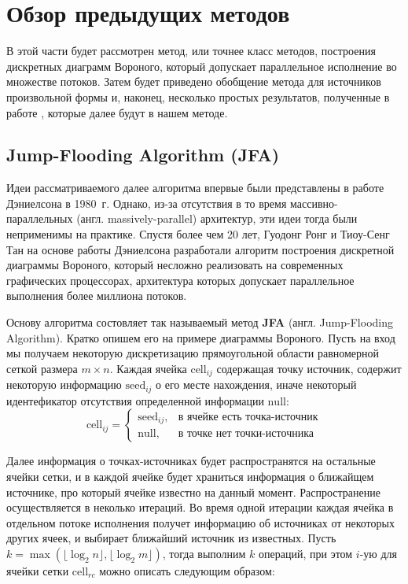 \documentclass[12pt]{article}
\begin{document}
\section{Обзор предыдущих методов}
В этой части будет рассмотрен метод, или точнее класс методов, построения
дискретных диаграмм Вороного, который допускает
параллельное исполнение во множестве потоков. Затем будет приведено обобщение
метода для источников произвольной формы и, наконец, несколько простых
результатов, полученные в работе \cite{timeb}, которые далее будут в нашем методе.

\subsection{Jump-Flooding Algorithm (JFA)}
\label{jfa_desc}
Идеи рассматриваемого далее алгоритма впервые были представлены в работе
Дэниелсона \cite{distmap} в 1980~г. Однако, из-за отсутствия в то время
массивно-параллельных (англ. massively-parallel) архитектур, эти идеи тогда
были неприменимы на практике. Спустя более чем 20 лет, Гуодонг Ронг и
Тиоу-Сенг Тан \cite{jfa} на основе работы Дэниелсона разработали алгоритм
построения дискретной диаграммы Вороного, который несложно реализовать на
современных графических процессорах, архитектура которых допускает параллельное
выполнения более миллиона потоков.

Основу алгоритма состовляет так называемый метод \textbf{JFA} (англ.
Jump-Flooding Algorithm). Кратко опишем его на примере диаграммы Вороного.
Пусть на вход мы получаем 
некоторую дискретизацию прямоугольной области равномерной сеткой размера
$m \times n$. Каждая ячейка $\mathrm{cell}_{ij}$ содержащая точку источник,
содержит некоторую информацию $\mathrm{seed}_{ij}$ о его месте нахождения,
иначе некоторый идентефикатор отсутствия определенной информации ${\mathrm{null}}$:
$$
	\mathrm{cell}_{ij} = \left\lbrace
	\begin{array}{ll}
	\mathrm{seed}_{ij}, & \mbox{в ячейке есть точка-источник} \\
	\mathrm{null}, & \mbox{в точке нет точки-источника}
	\end{array}
	\right.
$$

Далее информация о точках-источниках будет распространятся на остальные ячейки
сетки, и в каждой ячейке будет храниться информация о ближайщем источнике, про
который ячейке известно на данный момент. Распространение осуществляется в
неколько итераций. Во время одной итерации каждая ячейка в отдельном потоке
исполнения получет информацию об источниках от некоторых других ячеек, и
выбирает ближайший источник из известных. Пусть 
$k = \max(\lfloor\log_2n\rfloor, \lfloor\log_2m\rfloor)$, тогда выполним $k$
операций, при этом $i$-ую для ячейки сетки $\mathrm{cell}_{rc}$ можно описать
следующим образом:
\end{document}
